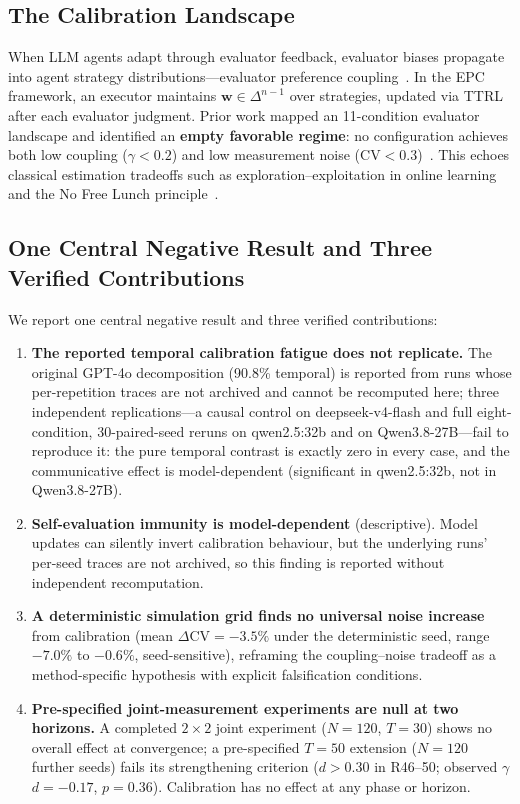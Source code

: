 \documentclass[11pt]{article}
\newcommand{\CV}{\ensuremath{\mathrm{CV}}}
\theoremstyle{definition}
\theoremstyle{remark}
\begin{document}
\subsection{The Calibration Landscape}

When LLM agents adapt through evaluator feedback, evaluator biases propagate into agent strategy distributions---evaluator preference coupling~\citep{epc2026}. In the EPC framework, an executor maintains $\mathbf{w} \in \Delta^{n-1}$ over strategies, updated via TTRL after each evaluator judgment. Prior work mapped an 11-condition evaluator landscape and identified an \textbf{empty favorable regime}: no configuration achieves both low coupling ($\gamma < 0.2$) and low measurement noise ($\CV < 0.3$)~\citep{caleffects2026}. This echoes classical estimation tradeoffs such as exploration--exploitation in online learning~\citep{bubeck2012regret} and the No Free Lunch principle~\citep{wolpert1997no}.

\subsection{One Central Negative Result and Three Verified Contributions}

We report one central negative result and three verified contributions:
\begin{enumerate}[leftmargin=*,nosep]
    \item \textbf{The reported temporal calibration fatigue does not replicate.} The original GPT-4o decomposition (90.8\% temporal) is reported from runs whose per-repetition traces are not archived and cannot be recomputed here; three independent replications---a causal control on deepseek-v4-flash and full eight-condition, 30-paired-seed reruns on qwen2.5:32b and on Qwen3.8-27B---fail to reproduce it: the pure temporal contrast is exactly zero in every case, and the communicative effect is model-dependent (significant in qwen2.5:32b, not in Qwen3.8-27B).
    \item \textbf{Self-evaluation immunity is model-dependent} (descriptive). Model updates can silently invert calibration behaviour, but the underlying runs' per-seed traces are not archived, so this finding is reported without independent recomputation.
    \item \textbf{A deterministic simulation grid finds no universal noise increase} from calibration (mean $\Delta\CV = -3.5\%$ under the deterministic seed, range $-7.0\%$ to $-0.6\%$, seed-sensitive), reframing the coupling--noise tradeoff as a method-specific hypothesis with explicit falsification conditions.
    \item \textbf{Pre-specified joint-measurement experiments are null at two horizons.} A completed $2 \times 2$ joint experiment ($N{=}120$, $T{=}30$) shows no overall effect at convergence; a pre-specified $T{=}50$ extension ($N{=}120$ further seeds) fails its strengthening criterion ($d > 0.30$ in R46--50; observed $\gamma$ $d{=}-0.17$, $p{=}0.36$). Calibration has no effect at any phase or horizon.
\end{enumerate}
\end{document}
